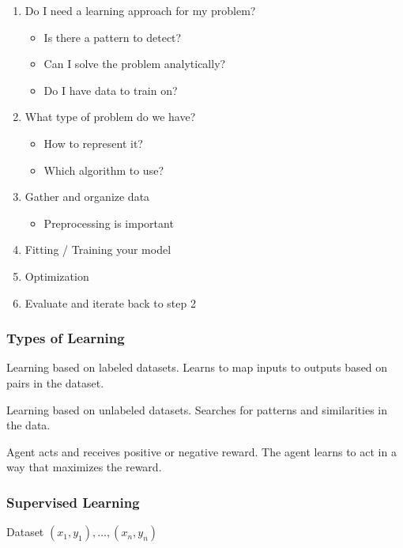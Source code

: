 \documentclass[
../../EiKI_Summary.tex,
]
{subfiles}
\begin{document}
\begin{enumerate}
    \item Do I need a learning approach for my problem?
    \begin{itemize}
        \item Is there a pattern to detect?
        \item Can I solve the problem analytically?
        \item Do I have data to train on?
    \end{itemize}
    \item What type of problem do we have?
    \begin{itemize}
        \item How to represent it?
        \item Which algorithm to use?
    \end{itemize}
    \item Gather and organize data
    \begin{itemize}
        \item Preprocessing is important
    \end{itemize}
    \item Fitting / Training your model
    \item Optimization
    \item Evaluate and iterate back to step 2
\end{enumerate}

\subsubsection{Types of Learning}
\begin{defbox}
    Learning based on labeled datasets. Learns to map inputs to outputs based on pairs in the dataset.
\end{defbox}

\begin{defbox}
    Learning based on unlabeled datasets. Searches for patterns and similarities in the data.
\end{defbox}

\begin{defbox}
    Agent acts and receives positive or negative reward. The agent learns to act in a way that maximizes the reward.
\end{defbox}

\newpage
\subsubsection{Supervised Learning}
 Dataset $(x_1,y_1), \ldots, (x_n,y_n)$
\end{document}
